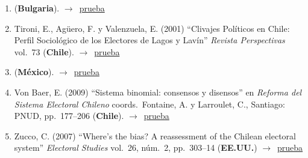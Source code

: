 \documentclass[12 pt, letter]{article}
\newenvironment{CitasMiTrabajo}{
    \begin{footnotesize}
    \begin{enumerate}[label={\footnotesize\emph{cita~\arabic*}},ref=\arabic*] %
        \setlength{\itemsep}{.1\itemsep}
        \setlength{\parskip}{.1\parskip}
    }{\end{enumerate}\end{footnotesize}}
\begin{document}
\begin{CitasMiTrabajo}
        \item {} (\textbf{Bulgaria}). $\rightarrow$~\href{http://ijpam.eu/contents/2008-47-4/3/3.pdf}{prueba}
        
        \item Tironi, E., Ag\"uero, F. y Valenzuela, E. (2001)
        ``Clivajes Pol\'iticos en Chile: Perfil Sociol\'ogico de los Electores de Lagos y Lav\'in''
        \emph{Revista Perspectivas} vol.\ 73 (\textbf{Chile}). $\rightarrow$~\href{https://github.com/emagar/cv/blob/master/citasMiTrab/mrs/tironietal2001.pdf}{prueba}

        \item {} (\textbf{M\'exico}). $\rightarrow$~\href{http://www.scielo.org.mx/scielo.php?pid=S1665-20372011000200005&script=sci_arttext}{prueba}
        
        \item Von Baer, E. (2009)
        ``Sistema binomial: consensos y disensos'' en
        \emph{Reforma del Sistema Electoral Chileno} coords.\ Fontaine, A. y Larroulet, C., Santiago: PNUD, pp.\ 177--206 (\textbf{Chile}). $\rightarrow$~\href{https://github.com/emagar/cv/blob/master/citasMiTrab/mrs/vonBaer2009.pdf}{prueba}

        \item Zucco, C. (2007)
        ``Where's the bias? A reassessment of the Chilean electoral system'' \emph{Electoral Studies} vol.\ 26, n\'um.\ 2,
        pp.\ 303--14  (\textbf{EE.UU.}) $\rightarrow$~\href{https://github.com/emagar/cv/blob/master/citasMiTrab/mrs/zucco.pdf}{prueba}

        \label{ncites:magar.etal.1998} %


\end{CitasMiTrabajo}
\end{document}
